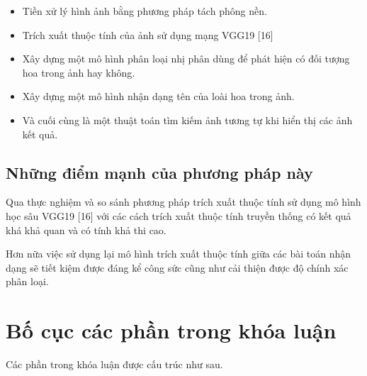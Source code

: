\documentclass[12pt]{report}
\begin{document}
		\begin{itemize}
			\item Tiền xử lý hình ảnh bằng phương pháp tách phông nền.
			\item Trích xuất thuộc tính của ảnh sử dụng mạng VGG19 [16]
			\item Xây dựng một mô hình phân loại nhị phân dùng để phát hiện có đối tượng hoa trong ảnh hay không.
			\item Xây dựng một mô hình nhận dạng tên của loài hoa trong ảnh.
			\item Và cuối cùng là một thuật toán tìm kiếm ảnh tương tự khi hiển thị các ảnh kết quả.
		\end{itemize}
																																																								
																																																								
		\subsection{Những điểm mạnh của phương pháp này}
		Qua thực nghiệm và so sánh phương pháp trích xuất thuộc tính sử dụng mô hình học sâu VGG19 [16] với các cách trích xuất thuộc tính truyền thống có kết quả khá khả quan và có tính khả thi cao.
																																																				
		Hơn nữa việc sử dụng lại mô hình trích xuất thuộc tính giữa các bài toán nhận dạng sẽ tiết kiệm được đáng kể công sức cũng như cải thiện được độ chính xác phân loại.
																																																				
		\section{Bố cục các phần trong khóa luận}
		Các phần trong khóa luận được cấu trúc như sau.
																																																				
\end{document}
